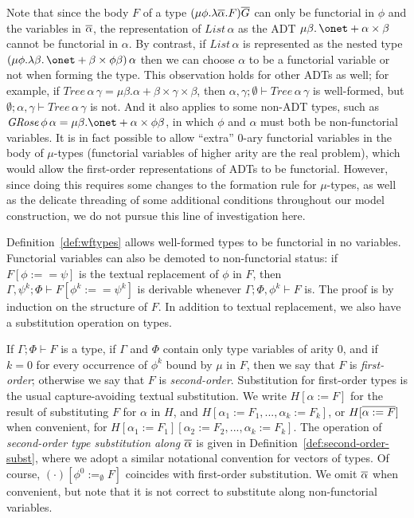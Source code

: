 \documentclass{lmcs}
\theoremstyle{plain}\newtheorem{satz}[thm]{Satz}
\begin{document}
{Note that since the body $F$ of a type $(\mu \phi. \lambda
\overline{\alpha}. F)\overline{G}$ can only be functorial in $\phi$ and the
variables in $\overline{\alpha}$, the representation of
$\mathit{List}\,\alpha$ as the ADT $\mu \beta. \,\onet + \alpha \times
\beta$ cannot be functorial in $\alpha$. By contrast, if
$\mathit{List}\,\alpha$ is represented as the nested type $(\mu
\phi. \lambda \beta.\,\onet + \beta \times \phi \beta)\,\alpha$ then
we can choose $\alpha$ to be a functorial variable or not when forming
the type. This observation holds for other ADTs as well; for example,
if $\mathit{Tree}\,\alpha\,\gamma = \mu \beta. \alpha + \beta \times
\gamma \times \beta$, then $\alpha, \gamma; \emptyset \vdash
\mathit{Tree}\,\alpha\,\gamma$ is well-formed, but $\emptyset; \alpha,
\gamma \vdash \mathit{Tree}\,\alpha\,\gamma$ is not. And it also
applies to some non-ADT types, such as $\mathit{GRose}\,\phi\,\alpha =
\mu \beta. \onet + \alpha \times \phi\beta$, in which $\phi$ and
$\alpha$ must both be non-functorial variables.  It is in fact
possible to allow ``extra'' $0$-ary functorial variables in the body
of $\mu$-types (functorial variables of higher arity are the real
problem), which would allow the first-order representations of ADTs to
be functorial. However, since doing this requires some changes to the
formation rule for $\mu$-types, as well as the delicate threading of
some additional conditions throughout our model construction, we do
not pursue this line of investigation here.

Definition~\ref{def:wftypes} allows well-formed types to be functorial
in no variables. Functorial variables can also be demoted to
non-functorial status: if\,$F[\phi :== \psi]$ is the textual
replacement of $\phi$ in $F$, then $\Gamma, \psi^k; \Phi \vdash
F[\phi^k :== \psi^k]$ is derivable whenever $\Gamma; \Phi, \phi^k
\vdash F$ is. The proof is by induction on the structure of $F$. In
addition to textual replacement, we also have a substitution operation
on types.

If $\Gamma; \Phi \vdash F$ is a type, if $\Gamma$ and $\Phi$ contain
only type variables of arity $0$, and if $k=0$ for every occurrence of
$\phi^k$ bound by $\mu$ in $F$, then we say that $F$ is {\em
  first-order}; otherwise we say that $F$ is {\em
  second-order}. Substitution for first-order types is the usual
capture-avoiding textual substitution. We write $H[\alpha := F]$
for the result of substituting $F$ for $\alpha$ in $H$, and
$H[\alpha_1 := F_1,...,\alpha_k := F_k]$, or $H[\overline{\alpha := F}]$
when convenient, for $H[\alpha_1 := F_1][\alpha_2 := F_2,...,\alpha_k
  := F_k]$. The operation of {\em second-order type substitution along
  $\overline{\alpha}$} is given in Definition~\ref{def:second-order-subst},
where we adopt a similar notational convention for vectors of types.
Of course, $(\cdot)[\phi^0 :=_\emptyset F]$ coincides with first-order
substitution. We omit $\overline{\alpha}$ when convenient, but note that it
is not correct to substitute along non-functorial variables.

}
\end{document}
